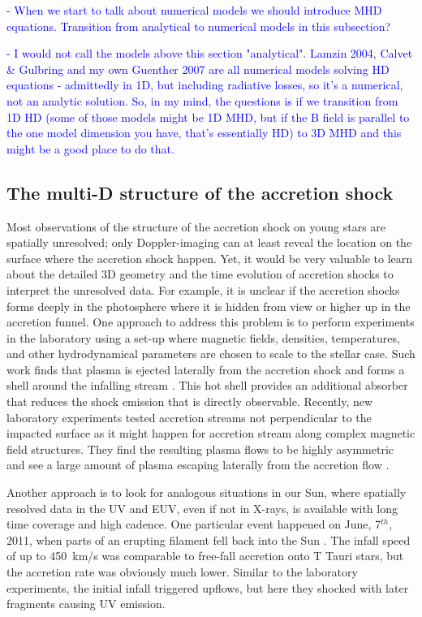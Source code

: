 \textcolor{blue}{
- When we start to talk about numerical models we should introduce MHD equations. Transition from analytical to numerical models in this subsection?}

\textcolor{blue}{- I would not call the models above this section "analytical". Lamzin 2004, Calvet \& Gulbring and my own Guenther 2007 are all numerical models solving HD equations - admittedly in 1D, but including radiative losses, so it's a numerical, not an analytic solution. So, in my mind, the questions is if we transition from 1D HD (some of those models might be 1D MHD, but if the B field is parallel to the one model dimension you have, that's essentially HD) to 3D MHD and this might be a good place to do that.}

\subsection{The multi-D structure of the accretion shock}

Most observations of the structure of the accretion shock on young stars are spatially unresolved; only Doppler-imaging can at least reveal the location on the surface where the accretion shock happen. Yet, it would be very valuable to learn about the detailed 3D geometry and the time evolution of accretion shocks to interpret the unresolved data. For example, it is unclear if the accretion shocks forms deeply in the photosphere where it is hidden from view or higher up in the accretion funnel. One approach to address this problem is to perform experiments in the laboratory using a set-up where magnetic fields, densities, temperatures, and other hydrodynamical parameters are chosen to scale to the stellar case. Such work finds that plasma is ejected laterally from the accretion shock and forms a shell around the infalling stream \cite{2017SciA....3E0982R} . This hot shell provides an additional absorber that reduces the shock emission that is directly observable. Recently, new laboratory experiments tested accretion streams not perpendicular to the impacted surface as it might happen for accretion stream along complex magnetic field structures. They find the resulting plasma flows to be highly asymmetric and see a large amount of plasma escaping laterally from the accretion flow \cite{2020A&A...642A..38B}.

Another approach is to look for analogous situations in our Sun, where spatially resolved data in the UV and EUV, even if not in X-rays, is available with long time coverage and high cadence. One particular event happened on June, 7$^{th}$, 2011, when parts of an erupting filament fell back into the Sun \cite{2013Sci...341..251R,2013A&A...559A.127O}. The infall speed of up to 450~km/s was comparable to free-fall accretion onto T Tauri stars, but the accretion rate was obviously much lower. Similar to the laboratory experiments, the initial infall triggered upflows, but here they shocked with later fragments causing UV emission.

